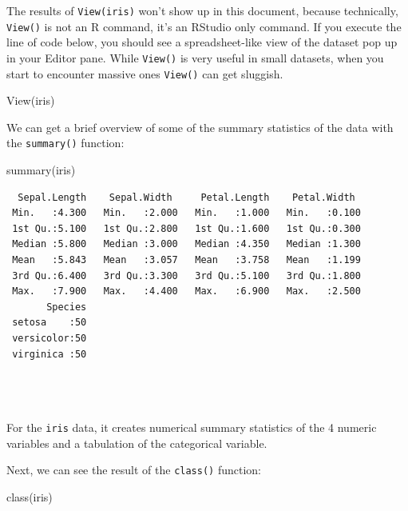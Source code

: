 \documentclass[
  letterpaper,
]{book}
\newenvironment{Shaded}{\begin{snugshade}}{\end{snugshade}}
\newcommand{\FunctionTok}[1]{\textcolor[rgb]{0.28,0.35,0.67}{#1}}
\newcommand{\NormalTok}[1]{\textcolor[rgb]{0.00,0.23,0.31}{#1}}
\begin{document}
The results of \texttt{View(iris)} won't show up in this document,
because technically, \texttt{View()} is not an R command, it's an
RStudio only command. If you execute the line of code below, you should
see a spreadsheet-like view of the dataset pop up in your Editor pane.
While \texttt{View()} is very useful in small datasets, when you start
to encounter massive ones \texttt{View()} can get sluggish.

\begin{Shaded}
\begin{Highlighting}[]
\FunctionTok{View}\NormalTok{(iris)}
\end{Highlighting}
\end{Shaded}

We can get a brief overview of some of the summary statistics of the
data with the \texttt{summary()} function:

\begin{Shaded}
\begin{Highlighting}[]
\FunctionTok{summary}\NormalTok{(iris)}
\end{Highlighting}
\end{Shaded}

\begin{verbatim}
  Sepal.Length    Sepal.Width     Petal.Length    Petal.Width   
 Min.   :4.300   Min.   :2.000   Min.   :1.000   Min.   :0.100  
 1st Qu.:5.100   1st Qu.:2.800   1st Qu.:1.600   1st Qu.:0.300  
 Median :5.800   Median :3.000   Median :4.350   Median :1.300  
 Mean   :5.843   Mean   :3.057   Mean   :3.758   Mean   :1.199  
 3rd Qu.:6.400   3rd Qu.:3.300   3rd Qu.:5.100   3rd Qu.:1.800  
 Max.   :7.900   Max.   :4.400   Max.   :6.900   Max.   :2.500  
       Species  
 setosa    :50  
 versicolor:50  
 virginica :50  
                
                
                
\end{verbatim}

For the \texttt{iris} data, it creates numerical summary statistics of
the 4 numeric variables and a tabulation of the categorical variable.

Next, we can see the result of the \texttt{class()} function:

\begin{Shaded}
\begin{Highlighting}[]
\FunctionTok{class}\NormalTok{(iris)}
\end{Highlighting}
\end{Shaded}
\end{document}
